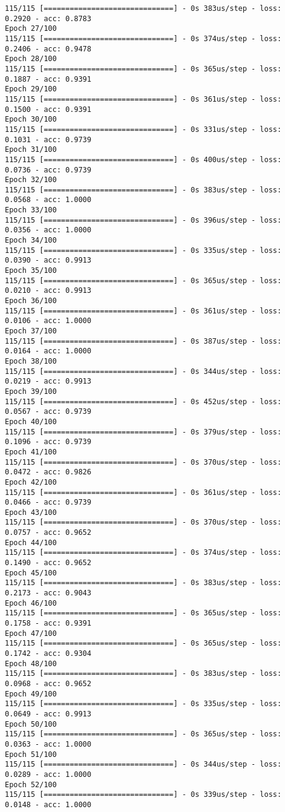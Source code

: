 \documentclass[11pt]{article}
\begin{document}
\begin{Verbatim}[commandchars=\\\{\}]
115/115 [==============================] - 0s 383us/step - loss: 0.2920 - acc: 0.8783
Epoch 27/100
115/115 [==============================] - 0s 374us/step - loss: 0.2406 - acc: 0.9478
Epoch 28/100
115/115 [==============================] - 0s 365us/step - loss: 0.1887 - acc: 0.9391
Epoch 29/100
115/115 [==============================] - 0s 361us/step - loss: 0.1500 - acc: 0.9391
Epoch 30/100
115/115 [==============================] - 0s 331us/step - loss: 0.1031 - acc: 0.9739
Epoch 31/100
115/115 [==============================] - 0s 400us/step - loss: 0.0736 - acc: 0.9739
Epoch 32/100
115/115 [==============================] - 0s 383us/step - loss: 0.0568 - acc: 1.0000
Epoch 33/100
115/115 [==============================] - 0s 396us/step - loss: 0.0356 - acc: 1.0000
Epoch 34/100
115/115 [==============================] - 0s 335us/step - loss: 0.0390 - acc: 0.9913
Epoch 35/100
115/115 [==============================] - 0s 365us/step - loss: 0.0210 - acc: 0.9913
Epoch 36/100
115/115 [==============================] - 0s 361us/step - loss: 0.0106 - acc: 1.0000
Epoch 37/100
115/115 [==============================] - 0s 387us/step - loss: 0.0164 - acc: 1.0000
Epoch 38/100
115/115 [==============================] - 0s 344us/step - loss: 0.0219 - acc: 0.9913
Epoch 39/100
115/115 [==============================] - 0s 452us/step - loss: 0.0567 - acc: 0.9739
Epoch 40/100
115/115 [==============================] - 0s 379us/step - loss: 0.1096 - acc: 0.9739
Epoch 41/100
115/115 [==============================] - 0s 370us/step - loss: 0.0472 - acc: 0.9826
Epoch 42/100
115/115 [==============================] - 0s 361us/step - loss: 0.0466 - acc: 0.9739
Epoch 43/100
115/115 [==============================] - 0s 370us/step - loss: 0.0757 - acc: 0.9652
Epoch 44/100
115/115 [==============================] - 0s 374us/step - loss: 0.1490 - acc: 0.9652
Epoch 45/100
115/115 [==============================] - 0s 383us/step - loss: 0.2173 - acc: 0.9043
Epoch 46/100
115/115 [==============================] - 0s 365us/step - loss: 0.1758 - acc: 0.9391
Epoch 47/100
115/115 [==============================] - 0s 365us/step - loss: 0.1742 - acc: 0.9304
Epoch 48/100
115/115 [==============================] - 0s 383us/step - loss: 0.0968 - acc: 0.9652
Epoch 49/100
115/115 [==============================] - 0s 335us/step - loss: 0.0649 - acc: 0.9913
Epoch 50/100
115/115 [==============================] - 0s 365us/step - loss: 0.0363 - acc: 1.0000
Epoch 51/100
115/115 [==============================] - 0s 344us/step - loss: 0.0289 - acc: 1.0000
Epoch 52/100
115/115 [==============================] - 0s 339us/step - loss: 0.0148 - acc: 1.0000

\end{Verbatim}
\end{document}
